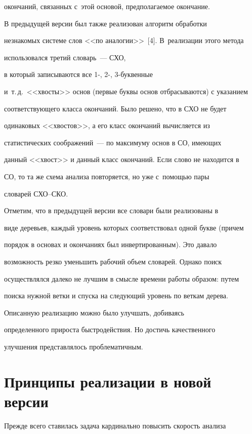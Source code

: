 окончаний, связанных с~этой основой, предполагаемое окончание.



    В предыдущей версии был также реализован алгоритм обработки

незнакомых системе слов <<по аналогии>>~[4]. В~реализации этого метода

использовался третий словарь~--- СХО,

в который записываются все 1-, 2-, 3-бук\-вен\-ные

и~т.\,д.\ <<хвос\-ты>> основ (первые буквы основ отбрасываются) с указанием

соответствующего класса окончаний. Было решено, что в СХО не будет

одинаковых <<хвос\-тов>>, а его класс окончаний вычисляется из

статистических соображений~--- по максимуму основ в СО, имеющих

данный <<хвост>> и данный класс окончаний. Если слово не находится в

 СО, то та же схема анализа повторяется, но уже с~по\-мощью пары

словарей СХО--СКО.



    Отметим, что в предыдущей версии все словари были реализованы в

виде деревьев, каждый уровень которых соответствовал одной букве (причем

порядок в основах и окончаниях был инвертированным). Это давало

возможность резко уменьшить рабочий объем словарей. Однако поиск

осуществлялся далеко не лучшим в смысле времени работы образом: путем

поиска нужной ветки и спуска на следующий уровень по веткам дерева.



    Описанную реализацию можно было улучшать, добиваясь

определенного прироста быстродействия. Но достичь качественного

улучшения представлялось проблематичным.



\section{Принципы реализации в новой версии}



    Прежде всего ставилась задача кардинально повысить скорость анализа

